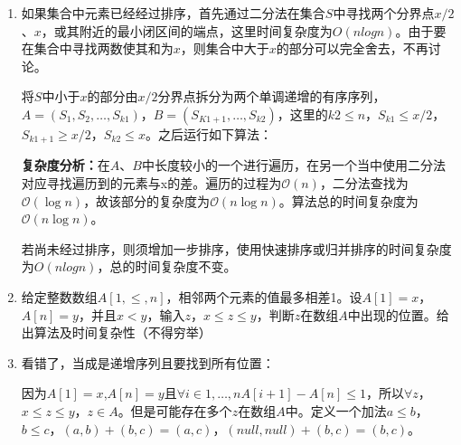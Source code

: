 \documentclass[12pt,a4paper]{article}
\makeatletter
\newtheorem*{solution}{Solution}
\theoremstyle{definition}
\renewenvironment{solution}[1][Solution] {\par\pushQED{\qed}\normalfont\topsep6\p@\@plus6\p@\relax\trivlist\item[\hskip\labelsep\bfseries#1\@addpunct{.}]\ignorespaces}{\popQED\endtrivlist\@endpefalse} \makeatother
\makeatother
\begin{document}
\begin{enumerate}
\begin{solution}
如果集合中元素已经经过排序，首先通过二分法在集合$S$中寻找两个分界点$x/2$、$x$，或其附近的最小闭区间的端点，这里时间复杂度为$O(nlogn)$。由于要在集合中寻找两数使其和为$x$，则集合中大于$x$的部分可以完全舍去，不再讨论。

将$S$中小于$x$的部分由$x/2$分界点拆分为两个单调递增的有序序列，$A=(S_1,S_2,\ldots,S_{k1})$，$B=(S_{K1+1},\ldots,S_{k2})$，这里的$k2 \leq n$，$S_{k1} \leq x/2$，$S_{k1+1} \geq x/2$，$S_{k2} \leq x$。之后运行如下算法：

\begin{algorithm}[H]
	\SetAlgoLined
	\caption{$find\_elements(A,B)$}
\end{algorithm}

\textbf{复杂度分析：}在$A$、$B$中长度较小的一个进行遍历，在另一个当中使用二分法对应寻找遍历到的元素与x的差。遍历的过程为$\mathcal{O}(n)$，二分法查找为$\mathcal{O}(\log n)$，故该部分的复杂度为$\mathcal{O}(n\log n)$。算法总的时间复杂度为$\mathcal{O}(n\log n)$。

若尚未经过排序，则须增加一步排序，使用快速排序或归并排序的时间复杂度为$O(nlogn)$，总的时间复杂度不变。
\end{solution}


\item 给定整数数组$A[1,\leq ,n]$，相邻两个元素的值最多相差1。设$A[1]=x$，$A[n]=y$，并且$x<y$，输入$z$，$x \leq z \leq y$，判断$z$在数组$A$中出现的位置。给出算法及时间复杂性（不得穷举）

\begin{solution}
看错了，当成是递增序列且要找到所有位置：

因为$A[1]=x$,$A[n]=y$且$\forall i \in {1,\ldots,n} A[i+1]-A[n]\leq 1$，所以$\forall z$，$x\leq z\leq y$，$z\in A$。但是可能存在多个$z$在数组$A$中。定义一个加法$a\leq b$，$b\leq c$，$(a,b)+(b,c)=(a,c)$，$(null,null)+(b,c)=(b,c)$。

\begin{algorithm}[H]
	\SetAlgoLined
	\caption{$binary_search(start,end)$}
\end{algorithm}


\end{solution}
\end{enumerate}
\end{document}
